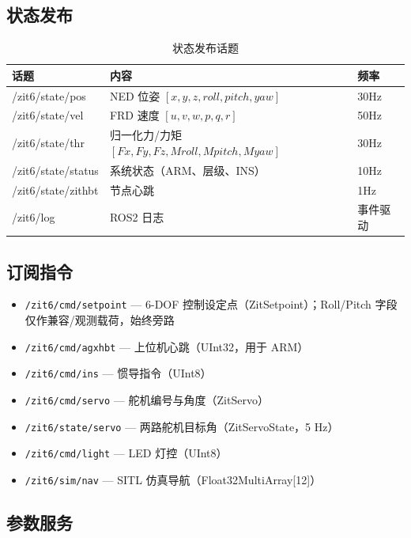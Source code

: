\documentclass[12pt,a4paper]{article}
\begin{document}
\subsection{状态发布}

\begin{table}[H]
\centering
\begin{tabularx}{\textwidth}{lXl}
\toprule
\textbf{话题} & \textbf{内容} & \textbf{频率} \\
\midrule
/zit6/state/pos & NED 位姿 $[x,y,z,roll,pitch,yaw]$ & 30Hz \\
/zit6/state/vel & FRD 速度 $[u,v,w,p,q,r]$ & 50Hz \\
/zit6/state/thr & 归一化力/力矩 $[Fx,Fy,Fz,Mroll,Mpitch,Myaw]$ & 30Hz \\
/zit6/state/status & 系统状态（ARM、层级、INS） & 10Hz \\
/zit6/state/zithbt & 节点心跳 & 1Hz \\
/zit6/log & ROS2 日志 & 事件驱动 \\
\bottomrule
\end{tabularx}
\caption{状态发布话题}
\end{table}

\subsection{订阅指令}

\begin{itemize}
    \item \texttt{/zit6/cmd/setpoint} — 6-DOF 控制设定点（ZitSetpoint）；Roll/Pitch 字段仅作兼容/观测载荷，始终旁路
    \item \texttt{/zit6/cmd/agxhbt} — 上位机心跳（UInt32，用于 ARM）
    \item \texttt{/zit6/cmd/ins} — 惯导指令（UInt8）
    \item \texttt{/zit6/cmd/servo} — 舵机编号与角度（ZitServo）
    \item \texttt{/zit6/state/servo} — 两路舵机目标角（ZitServoState，5 Hz）
    \item \texttt{/zit6/cmd/light} — LED 灯控（UInt8）
    \item \texttt{/zit6/sim/nav} — SITL 仿真导航（Float32MultiArray[12]）
\end{itemize}

\subsection{参数服务}
\end{document}
